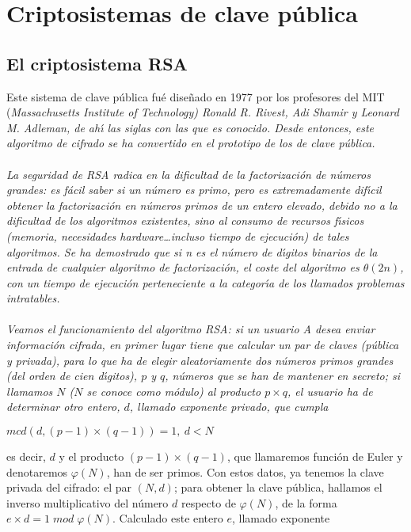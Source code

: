 \section{Criptosistemas de clave p\'ublica}
\subsection{El criptosistema RSA}
Este sistema de clave p\'ublica fu\'e dise\~nado en
1977 por los profesores del MIT (\it{Massachusetts Institute of Technology}\rm)
Ronald R. Rivest, Adi Shamir y Leonard M. Adleman, de ah\'{\i} las siglas
con las que es conocido. Desde entonces, este algoritmo de cifrado se ha
convertido en el prototipo de los de clave p\'ublica.\\
\\La seguridad de RSA radica en la dificultad de la factorizaci\'on
de n\'umeros grandes: es f\'acil saber si un n\'umero es
primo, pero es extremadamente dif\'{\i}cil obtener la factorizaci\'on
en n\'umeros primos de un entero elevado, debido no a la dificultad
de los algoritmos existentes, sino al consumo de recursos f\'{\i}sicos
(memoria, necesidades {\it hardware}\ldots incluso tiempo de ejecuci\'on) de
tales algoritmos. Se ha demostrado que si n es el n\'umero de d\'{\i}gitos
binarios de la entrada de cualquier algoritmo de factorizaci\'on,
el coste del algoritmo es $\theta(2n)$, con un tiempo de ejecuci\'on perteneciente
a la categor\'{\i}a de los llamados problemas intratables.\\
\\Veamos el funcionamiento del algoritmo RSA: si un usuario A desea enviar
informaci\'on cifrada, en primer lugar tiene que calcular un par de claves 
(p\'ublica y privada), para lo que ha de elegir aleatoriamente dos n\'umeros
primos grandes (del orden de cien d\'{\i}gitos), $p$ y $q$, n\'umeros que
se han de mantener en secreto; si llamamos $N$ ($N$ se conoce como m\'odulo) al 
producto $p\times q$, el usuario ha de determinar otro entero, $d$, llamado 
exponente privado, que cumpla
\begin{center}
$mcd(d,(p-1)\times(q-1))=1,\: d<N$ 
\end{center}
es decir, $d$ y el producto $(p-1)\times (q-1)$, que llamaremos funci\'on de
Euler y denotaremos $\varphi(N)$, han de ser primos. Con estos datos, ya 
tenemos la clave privada
del cifrado: el par $(N,d)$; para obtener la clave p\'ublica, hallamos
el inverso multiplicativo del n\'umero $d$ respecto de $\varphi(N)$, de la forma
$e\times d=1\;mod\;\varphi(N)$. Calculado este entero $e$, llamado exponente 
